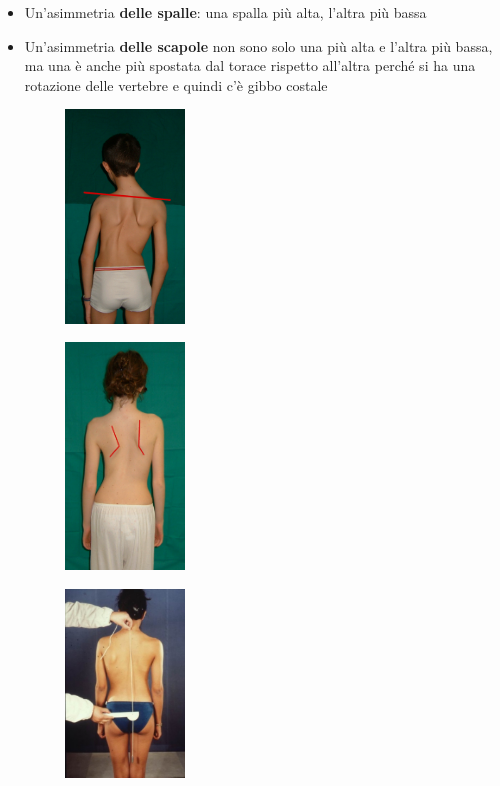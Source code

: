 \begin{itemize}
\item
  Un'asimmetria \textbf{delle spalle}: una spalla più alta, l'altra più
  bassa
\item
  Un'asimmetria \textbf{delle scapole} non sono solo una più alta e
  l'altra più bassa, ma una è anche più spostata dal torace rispetto
  all'altra perché si ha una rotazione delle vertebre e quindi c'è gibbo
  costale
  \begin{figure}[!ht]
  \centering
  	\includegraphics[width=0.3\textwidth]{012/image21.png}
  \end{figure}
\begin{figure}[!ht]
\centering
	\includegraphics[width=0.3\textwidth]{012/image22.png}
\end{figure}
\begin{figure}[!ht]
\centering
	\includegraphics[width=0.3\textwidth]{012/image23.jpeg}
\end{figure}


\end{itemize}
